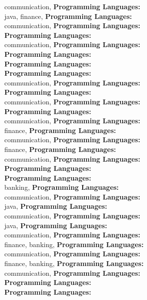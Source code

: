 communication, \textbf{Programming Languages:} \\
java, finance, \textbf{Programming Languages:} \\
communication, \textbf{Programming Languages:} \\
\textbf{Programming Languages:} \\
communication, \textbf{Programming Languages:} \\
\textbf{Programming Languages:} \\
\textbf{Programming Languages:} \\
\textbf{Programming Languages:} \\
communication, \textbf{Programming Languages:} \\
\textbf{Programming Languages:} \\
communication, \textbf{Programming Languages:} \\
\textbf{Programming Languages:} \\
communication, \textbf{Programming Languages:} \\
finance, \textbf{Programming Languages:} \\
communication, \textbf{Programming Languages:} \\
finance, \textbf{Programming Languages:} \\
communication, \textbf{Programming Languages:} \\
\textbf{Programming Languages:} \\
\textbf{Programming Languages:} \\
banking, \textbf{Programming Languages:} \\
communication, \textbf{Programming Languages:} \\
java, \textbf{Programming Languages:} \\
communication, \textbf{Programming Languages:} \\
java, \textbf{Programming Languages:} \\
communication, \textbf{Programming Languages:} \\
finance, banking, \textbf{Programming Languages:} \\
communication, \textbf{Programming Languages:} \\
finance, banking, \textbf{Programming Languages:} \\
communication, \textbf{Programming Languages:} \\
\textbf{Programming Languages:} \\
\textbf{Programming Languages:} \\
